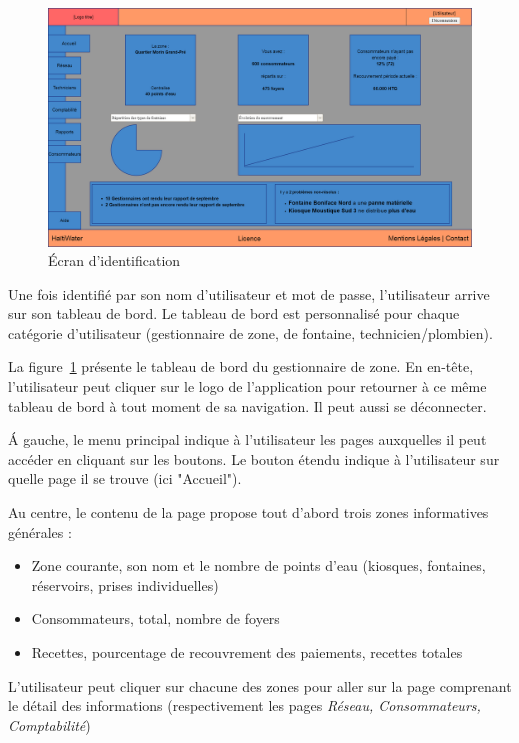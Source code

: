 \documentclass[a4paper, 11pt]{article}
\begin{document}
    \begin{figure}[H]
        \includegraphics[width=\textwidth]{Cahier_des_Charges/accueil}
        \caption{\'Ecran d'identification}
        \label{fig:zone_dashboard}
    \end{figure}

    Une fois identifié par son nom d'utilisateur et mot de passe, l'utilisateur arrive sur son tableau de bord. Le tableau de bord est personnalisé pour chaque catégorie d'utilisateur (gestionnaire de zone, de fontaine, technicien/plombien).

    La figure~\ref{fig:zone_dashboard} présente le tableau de bord du gestionnaire de zone. En en-tête, l'utilisateur peut cliquer sur le logo de l'application pour retourner à ce même tableau de bord à tout moment de sa navigation. Il peut aussi se déconnecter.

    \'A gauche, le menu principal indique à l'utilisateur les pages auxquelles il peut accéder en cliquant sur les boutons. Le bouton étendu indique à l'utilisateur sur quelle page il se trouve (ici "Accueil").

    Au centre, le contenu de la page propose tout d'abord trois zones informatives générales :
    \begin{itemize}
      \item Zone courante, son nom et le nombre de points d'eau (kiosques, fontaines, réservoirs, prises individuelles)
      \item Consommateurs, total, nombre de foyers
      \item Recettes, pourcentage de recouvrement des paiements, recettes totales
    \end{itemize}
    L'utilisateur peut cliquer sur chacune des zones pour aller sur la page comprenant le détail des informations (respectivement les pages \emph{Réseau, Consommateurs, Comptabilité})
\end{document}
